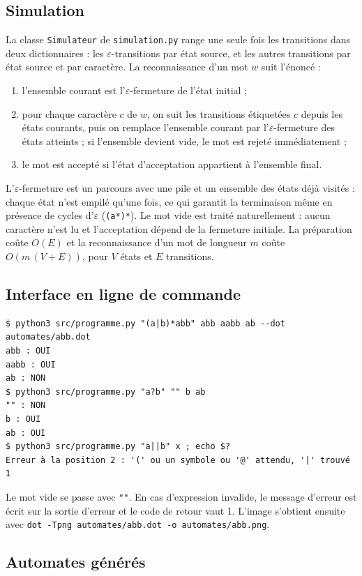 \documentclass[12pt,a4paper]{article}
\newcommand{\code}[1]{{\fontsize{10}{12}\selectfont\texttt{#1}}}
\newcommand{\eps}{\ensuremath{\varepsilon}}
\begin{document}
\subsection{Simulation}

La classe \code{Simulateur} de \code{simulation.py} range une seule fois les transitions dans deux
dictionnaires : les \eps-transitions par état source, et les autres transitions par état source et
par caractère. La reconnaissance d'un mot $w$ suit l'énoncé :
\begin{enumerate}
\item l'ensemble courant est l'\eps-fermeture de l'état initial ;
\item pour chaque caractère $c$ de $w$, on suit les transitions étiquetées $c$ depuis les états
  courants, puis on remplace l'ensemble courant par l'\eps-fermeture des états atteints ; si
  l'ensemble devient vide, le mot est rejeté immédiatement ;
\item le mot est accepté si l'état d'acceptation appartient à l'ensemble final.
\end{enumerate}
L'\eps-fermeture est un parcours avec une pile et un ensemble des états déjà visités : chaque état
n'est empilé qu'une fois, ce qui garantit la terminaison même en présence de cycles d'\eps{}
(\code{(a*)*}). Le mot vide est traité naturellement : aucun caractère n'est lu et l'acceptation
dépend de la fermeture initiale. La préparation coûte $O(E)$ et la reconnaissance d'un mot de
longueur $m$ coûte $O(m\,(V+E))$, pour $V$ états et $E$ transitions.

\subsection{Interface en ligne de commande}

\begin{lstlisting}[style=base]
$ python3 src/programme.py "(a|b)*abb" abb aabb ab --dot automates/abb.dot
abb : OUI
aabb : OUI
ab : NON
$ python3 src/programme.py "a?b" "" b ab
"" : NON
b : OUI
ab : OUI
$ python3 src/programme.py "a||b" x ; echo $?
Erreur à la position 2 : '(' ou un symbole ou '@' attendu, '|' trouvé
1
\end{lstlisting}

Le mot vide se passe avec \code{""}. En cas d'expression invalide, le message d'erreur est écrit sur
la sortie d'erreur et le code de retour vaut 1. L'image s'obtient ensuite avec
\code{dot -Tpng automates/abb.dot -o automates/abb.png}.

\subsection{Automates générés}
\end{document}
